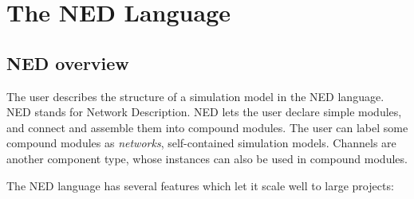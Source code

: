 \chapter{The NED Language}
\label{cha:the-ned-language}


\section{NED overview}

The user describes the structure of a simulation model in the NED language. NED
stands for Network Description. NED lets the user declare simple modules, and
connect and assemble them into compound modules. The user can label some compound
modules as \textit{networks}, self-contained simulation models. Channels are
another component type, whose instances can also be used in compound modules.

The NED language has several features which let it scale well to large projects:

